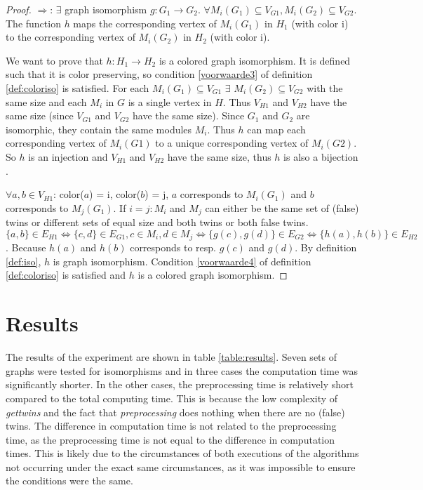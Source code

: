 \documentclass[twoside]{article}
\theoremstyle{definition}
\theoremstyle{plain}
\begin{document}
\begin{multicols}{2}
\begin{proof}
$\Rightarrow$: $\exists$ graph isomorphism $g: G_1 \to G_2$. $\forall M_i (G_1) \subseteq V_{G1}, M_i (G_2) \subseteq V_{G2}$. The function $h$ maps the corresponding vertex of $M_i (G_1)$ in $H_1$ (with color i) to the corresponding vertex of $M_i (G_2)$ in $H_2$ (with color i).

We want to prove that $h: H_1 \to H_2$ is a colored graph isomorphism. It is defined such that it is color preserving, so condition \ref{voorwaarde3} of definition \ref{def:coloriso} is satisfied. For each $M_i (G_1) \subseteq V_{G1}$ $\exists$ $M_i (G_2) \subseteq V_{G2}$ with the same size and each $M_i$ in $G$ is a single vertex in $H$. Thus $V_{H1}$ and $V_{H2}$ have the same size (since $V_{G1}$ and $V_{G2}$ have the same size). Since $G_1$ and $G_2$ are isomorphic, they contain the same modules $M_i$. Thus $h$ can map each corresponding vertex of $M_i (G1)$ to a unique corresponding vertex of $M_i (G2)$. So $h$ is an injection and $V_{H1}$ and $V_{H2}$ have the same size, thus $h$ is also a bijection \cite{website:proofwiki}.

$\forall a, b \in V_{H1}$: color($a$) = i, color($b$) = j, $a$ corresponds to $M_i (G_1)$ and $b$ corresponds to $M_j (G_1)$. If $i=j: M_i$ and $M_j$ can either be the same set of (false) twins or different sets of equal size and both twins or both false twins.  $ \{a, b\} \in E_{H1} \iff \{c,d\} \in E_{G1}, c \in  M_i, d \in  M_j \iff \{g(c),g(d)\} \in E_{G2} \iff \{h(a),h(b)\} \in E_{H2}$. Because $h(a)$ and $h(b)$ corresponds to resp. $g(c)$ and $g(d)$. By definition \ref{def:iso}, $h$ is graph isomorphism. Condition \ref{voorwaarde4} of definition \ref{def:coloriso} is satisfied and $h$ is a colored graph isomorphism.




\end{proof}

\section{Results}

The results of the experiment are shown in table \ref{table:results}. Seven sets of graphs were tested for isomorphisms and in three cases the computation time was significantly shorter. In the other cases, the preprocessing time is relatively short compared to the total computing time. This is because the low complexity of \emph{gettwins} and the fact that \emph{preprocessing} does nothing when there are no (false) twins. The difference in computation time is not related to the preprocessing time, as the preprocessing time is not equal to the difference in computation times. This is likely due to the circumstances of both executions of the algorithms not occurring under the exact same circumstances, as it was impossible to ensure the conditions were the same.  


\end{multicols}
\end{document}
